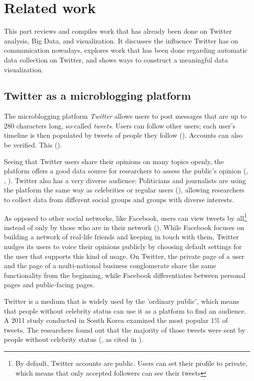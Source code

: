 \section{Related work}
This part reviews and compiles work that has already been done on Twitter analysis, Big Data, and visualization. It discusses the influence Twitter has on communication nowadays, explores work that has been done regarding automatic data collection on Twitter, and shows ways to construct a meaningful data visualization.

\subsection{Twitter as a microblogging platform}
The microblogging platform \emph{Twitter} allows users to post messages that are up to 280 characters long, so-called \emph{tweets}. Users can follow other users; each user's timeline is then populated by tweets of people they follow (\cite{thimmTwitterAlsWahlkampfmedium2012}). Accounts can also be verified. This  (\cite{twitterinc.VerifiedAccounts}).

Seeing that Twitter users share their opinions on many topics openly, the platform offers a good data source for researchers to assess the public's opinion (\cite{pak2010twitter}, \cite{pfaffenberger2016twitter}, \cite{broniatowski2014twitter}). Twitter also has a very diverse audience: Politicians and journalists are using the platform the same way as celebrities or regular users (\cite{pak2010twitter}), allowing researchers to collect data from different social groups and groups with diverse interests.

As opposed to other social networks, like Facebook, users can view tweets by all\footnote{By default, Twitter accounts are public. Users can set their profile to private, which means that only accepted followers can see their tweets} instead of only by those who are in their network (\cite{parkDoesTwitterMotivate2013}). While Facebook focuses on building a network of real-life friends and keeping in touch with them, Twitter nudges its users to voice their opinions publicly by choosing default settings for the user that supports this kind of usage. On Twitter, the private page of a user and the page of a multi-national business conglomerate share the same functionality from the beginning, while Facebook differentiates between personal pages and public-facing pages.

Twitter is a medium that is widely used by the 'ordinary public', which means that people without celebrity status can use it as a platform to find an audience. A 2011 study conducted in South Korea examined the most popular 1\% of tweets. The researchers found out that the majority of those tweets were sent by people without celebrity status (\cite{chang2011structure}, as cited in \cite{parkDoesTwitterMotivate2013}).

